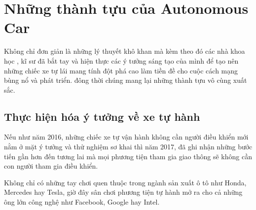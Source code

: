 \documentclass{article}
\begin{document}
\section{Những thành tựu của Autonomous Car}
Không chỉ đơn giản là những lý thuyết khô khan mà kèm theo đó các nhà khoa học , kĩ sư đã bắt tay và hiện thực các ý tưởng sáng tạo của mình để tạo nên những chiếc xe tự lái mang tính đột phá cao làm tiền đề cho cuộc cách mạng bùng nổ và phát triển. đông thời chúng mang lại những thành tựu vô cùng xuất sắc.
\subsection{Thực hiện hóa ý tưởng về xe tự hành}
Nếu như năm 2016, những chiếc xe tự vận hành không cần người điều khiển mới nằm ở mặt ý tưởng và thử nghiệm sơ khai thì năm 2017, đã ghi nhận những bước tiến gần hơn đến tương lai mà mọi phương tiện tham gia giao thông sẽ không cần con người tham gia điều khiển.

Không chỉ có những tay chơi quen thuộc trong ngành sản xuất ô tô như Honda, Mercedes hay Tesla, giờ đây sân chơi phương tiện tự hành mở ra cho cả những ông lớn công nghệ như Facebook, Google hay Intel.

 
\end{document}
